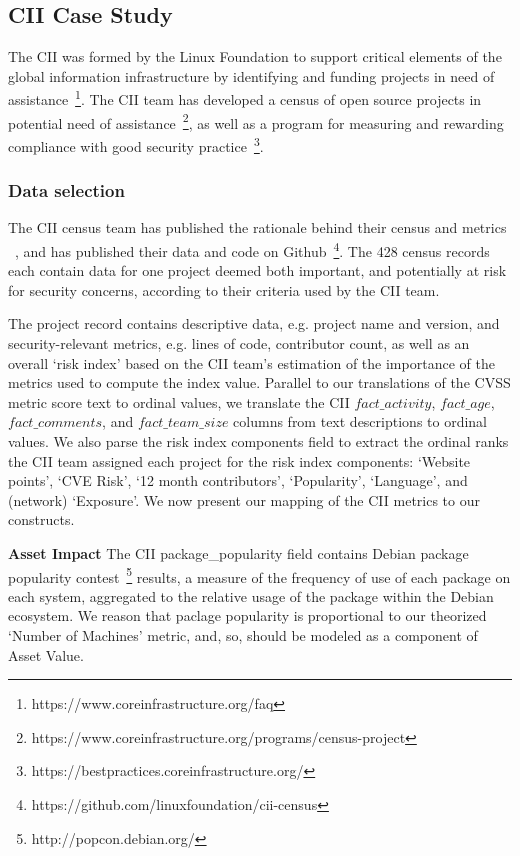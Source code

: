 \subsection{CII Case Study}
The CII was formed by the Linux Foundation to support critical elements of the global information infrastructure by identifying and funding projects in need of assistance~\footnote{https://www.coreinfrastructure.org/faq}. The CII team has developed a census of open source projects in potential need of assistance~\footnote{https://www.coreinfrastructure.org/programs/census-project}, as well as a program for measuring and rewarding compliance with good security practice~\footnote{https://bestpractices.coreinfrastructure.org/}.

\subsubsection{Data selection}
\label{sec:cii_selection}
The CII census team has published the rationale behind their census and metrics ~\cite{wheeler2015open}, and has published their data and code on Github~\footnote{https://github.com/linuxfoundation/cii-census}. The 428 census records each contain data for one project deemed both important, and potentially at risk for security concerns, according to their criteria used by the CII team.

The project record contains descriptive data, e.g. project name and version, and security-relevant metrics, e.g. lines of code, contributor count, as well as an overall `risk index' based on the CII team's estimation of the importance of the metrics used to compute the index value.  Parallel to our translations of the CVSS metric score text to ordinal values, we translate the CII $fact\_activity$, $fact\_age$, $fact\_comments$, and $fact\_team\_size$ columns from text descriptions to ordinal values. We also parse the risk index components field to extract the ordinal ranks the CII team assigned each project for the risk index components: `Website points', `CVE Risk', `12 month contributors', `Popularity', `Language', and (network) `Exposure'. We now present our mapping of the CII metrics to our constructs.

\textbf{Asset Impact}
The CII package\_popularity field contains Debian package popularity contest~\footnote{http://popcon.debian.org/} results, a measure of the frequency of use of each package on each system, aggregated to the relative usage of the package within the Debian ecosystem. We reason that paclage popularity is proportional to our theorized `Number of Machines'  metric, and, so, should be modeled as a component of Asset Value.

